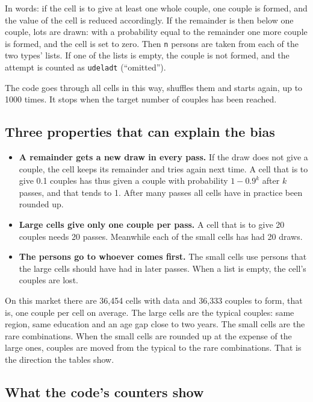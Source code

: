 \documentclass[12pt,a4paper]{article}
\newcommand{\kode}[1]{\texttt{#1}}
\begin{document}
In words: if the cell is to give at least one whole couple, one couple is formed, and the value of
the cell is reduced accordingly. If the remainder is then below one couple, lots are drawn: with a
probability equal to the remainder one more couple is formed, and the cell is set to zero. Then
\kode{n} persons are taken from each of the two types' lists. If one of the lists is empty, the
couple is not formed, and the attempt is counted as \kode{udeladt} (``omitted'').

The code goes through all cells in this way, shuffles them and starts again, up to 1000 times. It
stops when the target number of couples has been reached.

\subsection{Three properties that can explain the bias}

\begin{itemize}
\item \textbf{A remainder gets a new draw in every pass.} If the draw does not give a couple, the
cell keeps its remainder and tries again next time. A cell that is to give 0.1 couples has thus
given a couple with probability $1-0.9^k$ after $k$ passes, and that tends to 1. After many passes
all cells have in practice been rounded up.
\item \textbf{Large cells give only one couple per pass.} A cell that is to give 20 couples needs
20 passes. Meanwhile each of the small cells has had 20 draws.
\item \textbf{The persons go to whoever comes first.} The small cells use persons that the large
cells should have had in later passes. When a list is empty, the cell's couples are lost.
\end{itemize}

On this market there are 36,454 cells with data and 36,333 couples to form, that is, one couple per
cell on average. The large cells are the typical couples: same region, same education and an age
gap close to two years. The small cells are the rare combinations. When the small cells are rounded
up at the expense of the large ones, couples are moved from the typical to the rare combinations.
That is the direction the tables show.

\subsection{What the code's counters show}
\end{document}

